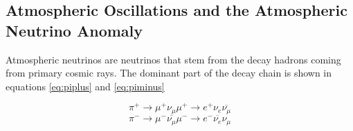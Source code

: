\subsection{Atmospheric Oscillations and the Atmospheric Neutrino Anomaly}
Atmospheric neutrinos are neutrinos that stem from the decay hadrons coming from primary cosmic rays. The dominant part of the decay chain is shown in equations  \ref{eq:piplus} and \ref{eq:piminus}

\begin{equation}
\label{eq:piplus}
\pi^{+} \rightarrow \mu^{+} \nu_{\mu} \mu^{+} \rightarrow e^{+} \nu_{e} \overline{\nu_{\mu}}
\end{equation}
\begin{equation}
\label{eq:piminus}
\pi^{-} \rightarrow \mu^{-} \overline{\nu_{\mu}} \mu^{-} \rightarrow e^{-} \overline{\nu_{e}} \nu_{\mu}
\end{equation}


